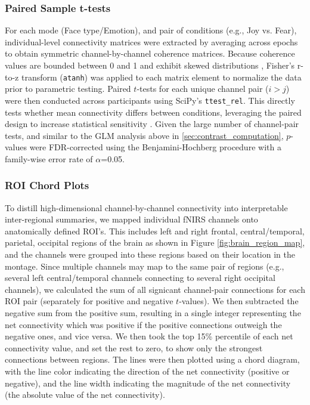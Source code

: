 \subsubsection{Paired Sample t-tests}
For each mode (Face type/Emotion), and pair of conditions (e.g., Joy vs. Fear), individual-level connectivity matrices were extracted by averaging across epochs to obtain symmetric channel-by-channel coherence matrices. 
Because coherence values are bounded between 0 and 1 and exhibit skewed distributions \citep{miranda_de_sa_coherence_2009}, Fisher's r-to-z transform (\texttt{atanh}) was applied to each matrix element to normalize the data prior to parametric testing. 
Paired $t$-tests for each unique channel pair ($i > j$) were then conducted across participants using SciPy's \texttt{ttest\_rel}.
This directly tests whether mean connectivity differs between conditions, leveraging the paired design to increase statistical sensitivity \citep{hu_characterizing_2023}. 
Given the large number of channel-pair tests, and similar to the GLM analysis above in \ref{sec:contrast_computation}, $p$-values were FDR-corrected using the Benjamini-Hochberg procedure \citep{singh_exploring_2006} with a family-wise error rate of $\alpha$=0.05.

\subsubsection{ROI Chord Plots}
To distill high-dimensional channel-by-channel connectivity into interpretable inter-regional summaries, we mapped individual fNIRS channels onto anatomically defined ROI's. 
This includes left and right frontal, central/temporal, parietal, occipital regions of the brain as shown in Figure \ref{fig:brain_region_map}, and the channels were grouped into these regions based on their location in the montage.
Since multiple channels may map to the same pair of regions (e.g., several left central/temporal channels connecting to several right occipital channels), we calculated the sum of all signicant channel-pair connections for each ROI pair (separately for positive and negative $t$-values). 
We then subtracted the negative sum from the positive sum, resulting in a single integer representing the net connectivity which was positive if the positive connections outweigh the negative ones, and vice versa.
We then took the top 15\% percentile of each net connectivity value, and set the rest to zero, to show only the strongest connections between regions.
The lines were then plotted using a chord diagram, with the line color indicating the direction of the net connectivity (positive or negative), and the line width indicating the magnitude of the net connectivity (the absolute value of the net connectivity).


